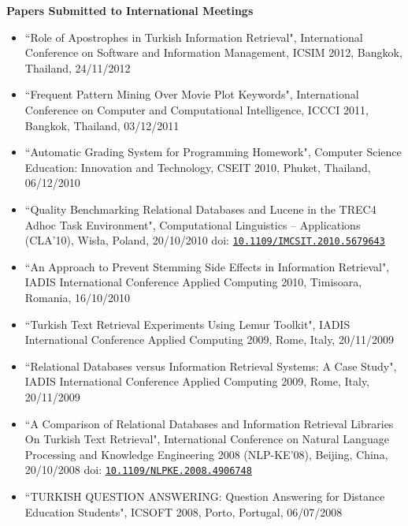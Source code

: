 \noindent 
\textbf{Papers Submitted to International Meetings}
\begin{itemize}

\item ``Role of Apostrophes in Turkish Information Retrieval", International Conference on Software and Information Management, ICSIM 2012, Bangkok, Thailand, 24/11/2012

\item ``Frequent Pattern Mining Over Movie Plot Keywords", International Conference on Computer and Computational Intelligence, ICCCI 2011, Bangkok, Thailand, 03/12/2011

\item ``Automatic Grading System for Programming Homework", Computer Science Education: Innovation and Technology, CSEIT 2010, Phuket, Thailand, 06/12/2010

\item ``Quality Benchmarking Relational Databases and Lucene in the TREC4 Adhoc Task Environment", Computational Linguistics -- Applications (CLA'10), Wis\l{}a, Poland, 20/10/2010 doi: \href{http://dx.doi.org/10.1109/IMCSIT.2010.5679643}{\texttt{10.1109/IMCSIT.2010.5679643}}

\item ``An Approach to Prevent Stemming Side Effects in Information Retrieval", IADIS International Conference Applied Computing 2010, Timisoara, Romania, 16/10/2010 

\item ``Turkish Text Retrieval Experiments Using Lemur Toolkit", IADIS International Conference Applied Computing 2009, Rome, Italy, 20/11/2009

\item ``Relational Databases versus Information Retrieval Systems: A Case Study", IADIS International Conference Applied Computing 2009, Rome, Italy, 20/11/2009

\item ``A Comparison of Relational Databases and Information Retrieval Libraries On Turkish Text Retrieval", International Conference on Natural Language Processing and Knowledge Engineering 2008 (NLP-KE'08), Beijing, China, 20/10/2008 doi: \href{http://dx.doi.org/10.1109/NLPKE.2008.4906748}{\texttt{10.1109/NLPKE.2008.4906748}} 

\item ``TURKISH QUESTION ANSWERING: Question Answering for Distance Education Students", ICSOFT 2008, Porto, Portugal, 06/07/2008
\end{itemize}